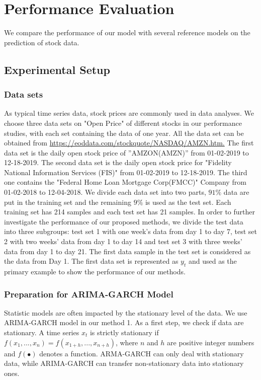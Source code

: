 \section{Performance Evaluation}
We compare the performance of our model with several reference models on the prediction of stock  data. 

\subsection{Experimental Setup}
\subsubsection{Data sets}
As typical time series data, stock prices are commonly used in data analyses. We choose three data sets on "Open Price" of different stocks in our performance studies, with each  set containing the data of one year. All the data set can be obtained from  \url{https://eoddata.com/stockquote/NASDAQ/AMZN.htm.}   %
The first data set is the daily open stock price of ”AMZON(AMZN)” from 01-02-2019 to 12-18-2019. The second data set is the daily open stock price for "Fidelity National Information Services (FIS)" from 01-02-2019 to 12-18-2019. The third one contains the "Federal Home Loan Mortgage Corp(FMCC)" Company from 01-02-2018 to 12-04-2018. We divide each data set into two parts, $91\%$ data are put in the training set and the remaining $9\%$ is used as the test set. Each training set has 214 samples and each test set has 21 samples. In order to further investigate the performance of our proposed methods, we  divide the test data into three subgroups: test set 1 with one week's data from day 1 to day 7, test set 2 with two weeks' data from day 1 to day 14 and test set 3 with three weeks' data from day 1 to day 21. The first data sample in the test set is considered as the data from Day 1. The first data set is represented as $y_t$ and used as the primary example to show the performance of our methods. 

\subsubsection{Preparation for ARIMA-GARCH Model } Statistic models are often impacted by the stationary level of the data. We use ARIMA-GARCH model in our method 1. As a first step, we check if data are stationary.
 A time series {$x_t$} is strictly stationary if $f(x_1,...,x_n) = f(x_{1+h},...,x_{n+h})$, where $n$ and $h$ are positive integer numbers and $f(\bullet)$ denotes a function. ARMA-GARCH can only deal with stationary data, while ARIMA-GARCH can transfer  non-stationary data into stationary ones.


